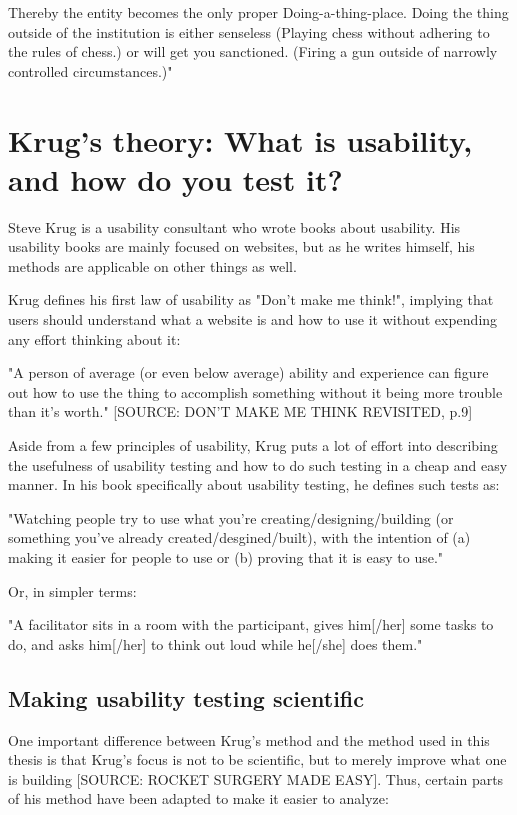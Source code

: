 Thereby the entity becomes the only proper Doing-a-thing-place. Doing the thing outside of the institution is either senseless (Playing chess without adhering to the rules of chess.) or will get you sanctioned. (Firing a gun outside of narrowly controlled circumstances.)"

\section{Krug's theory: What is usability, and how do you test it?}

Steve Krug is a usability consultant who wrote books about usability. His usability books are mainly focused on websites, but as he writes himself, his methods are applicable on other things as well.

Krug defines his first law of usability as "Don't make me think!", implying that users should understand what a website is and how to use it without expending any effort thinking about it:

"A person of average (or even below average) ability and experience can figure out how to use the thing to accomplish something without it being more trouble than it's worth." [SOURCE: DON'T MAKE ME THINK REVISITED, p.9]

Aside from a few principles of usability, Krug puts a lot of effort into describing the usefulness of usability testing and how to do such testing in a cheap and easy manner. In his book specifically about usability testing, he defines such tests as:

"Watching people try to use what you're creating/designing/building (or something you've already created/desgined/built), with the intention of (a) making it easier for people to use or (b) proving that it is easy to use."

Or, in simpler terms:

"A facilitator sits in a room with the participant, gives him[/her] some tasks to do, and asks him[/her] to think out loud while he[/she] does them."

\subsection{Making usability testing scientific}

One important difference between Krug's method and the method used in this thesis is that Krug's focus is not to be scientific, but to merely improve what one is building [SOURCE: ROCKET SURGERY MADE EASY]. Thus, certain parts of his method have been adapted to make it easier to analyze:

